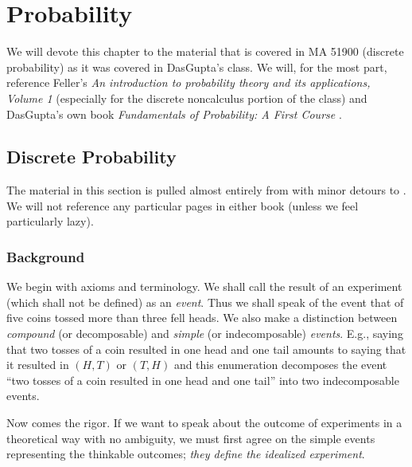 \chapter{Probability}
We will devote this chapter to the material that is covered in MA 51900
(discrete probability) as it was covered in DasGupta's class. We will, for
the most part, reference Feller's \emph{An introduction to probability
  theory and its applications, Volume 1} \cite{feller} (especially for the
discrete noncalculus portion of the class) and DasGupta's own book
\emph{Fundamentals of Probability: A First Course} \cite{dasgupta}.

\section{Discrete Probability}
The material in this section is pulled almost entirely from \cite{feller}
with minor detours to \cite{dasgupta}. We will not reference any particular
pages in either book (unless we feel particularly lazy).

\subsection{Background}
We begin with axioms and terminology. We shall call the result of an
experiment (which shall not be defined) as an \emph{event}. Thus we shall
speak of the event that of five coins tossed more than three fell heads. We
also make a distinction between \emph{compound} (or decomposable) and
\emph{simple} (or indecomposable) \emph{events}. E.g., saying that two
tosses of a coin resulted in one head and one tail amounts to saying that
it resulted in \((H,T)\) or \((T,H)\) and this enumeration decomposes the
event ``two tosses of a coin resulted in one head and one tail'' into two
indecomposable events.

Now comes the rigor. If we want to speak about the outcome of experiments
in a theoretical way with no ambiguity, we must first agree on the simple
events representing the thinkable outcomes; \emph{they define the idealized
experiment}.

